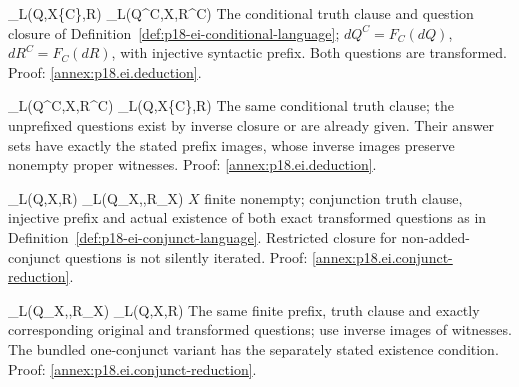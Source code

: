   {_L(Q,X\cup\{C\},R)}
  {_L(Q^C,X,R^C)}
  {The conditional truth clause and question closure of
   Definition~\ref{def:p18-ei-conditional-language};
   \(dQ^C=F_C(dQ)\), \(dR^C=F_C(dR)\), with injective syntactic
   prefix. Both questions are transformed. Proof: \ref{annex:p18.ei.deduction}.}

  {_L(Q^C,X,R^C)}
  {_L(Q,X\cup\{C\},R)}
  {The same conditional truth clause; the unprefixed questions exist by
   inverse closure or are already given. Their answer sets have exactly the
   stated prefix images, whose inverse images preserve nonempty proper witnesses.
   Proof: \ref{annex:p18.ei.deduction}.}

  {_L(Q,X,R)}
  {_L(Q_X,\varnothing,R_X)}
  {\(X\) finite nonempty; conjunction truth clause, injective prefix and
   actual existence of both exact transformed questions as in
   Definition~\ref{def:p18-ei-conjunct-language}. Restricted closure for
   non-added-conjunct questions is not silently iterated.
   Proof: \ref{annex:p18.ei.conjunct-reduction}.}

  {_L(Q_X,\varnothing,R_X)}
  {_L(Q,X,R)}
  {The same finite prefix, truth clause and exactly corresponding original
   and transformed questions; use inverse images of witnesses. The bundled
   one-conjunct variant has the separately stated existence condition.
   Proof: \ref{annex:p18.ei.conjunct-reduction}.}
